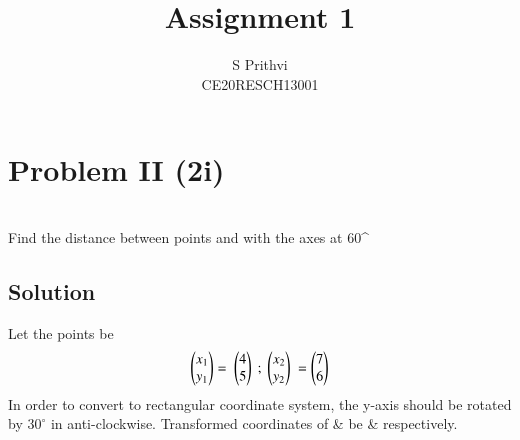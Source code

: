 \documentclass[journal,12pt,twocolumn]{IEEEtran}
\begin{document}
\def\putbox#1#2#3{\makebox[0in][l]{\makebox[#1][l]{}\raisebox{\baselineskip}[0in][0in]{\raisebox{#2}[0in][0in]{#3}}}}
     \def\rightbox#1{\makebox[0in][r]{#1}}
     \def\centbox#1{\makebox[0in]{#1}}
     \def\topbox#1{\raisebox{-\baselineskip}[0in][0in]{#1}}
     \def\midbox#1{\raisebox{-0.5\baselineskip}[0in][0in]{#1}}
\vspace{3cm}
\title{Assignment 1}
\author{S Prithvi \\ CE20RESCH13001}
\maketitle
\newpage
\bigskip
\renewcommand{\thefigure}{\theenumi}
\renewcommand{\thetable}{\theenumi}
\section{Problem II (2\Large{i})}
\\Find the distance between points  and  with the axes at 60^{\circ}
\subsection{Solution}
Let the points be
\begin{equation}
\myvec{x_1\\y_1} = \ \myvec{4 \\5} \ ; \ \myvec{x_2\\y_2} \ = \myvec{7\\ 6}\label{1.0.1}
\end{equation}
In order to convert to rectangular coordinate system, the y-axis should be rotated by $30^{\circ}$ in anti-clockwise.
Transformed coordinates of  \&  be  \&  respectively.
\end{document}
